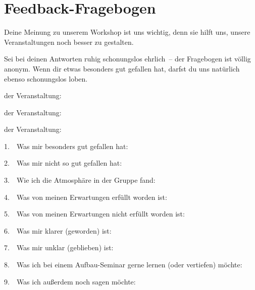 \documentclass[a4paper,12pt]{scrartcl}
\begin{document}
    \raggedbottom


    \section*{Feedback-Fragebogen}

    Deine Meinung zu unserem Workshop ist uns wichtig, denn sie hilft uns, unsere Veranstaltungen noch besser zu gestalten.

    Sei bei deinen Antworten ruhig schonungslos ehrlich~-- der Fragebogen ist völlig anonym. Wenn dir etwas besonders gut gefallen hat, darfst du uns natürlich ebenso schonungslos loben.

     der Veranstaltung:

     der Veranstaltung:

     der Veranstaltung:
    \vspace{1em}


    1.~~Was mir besonders gut gefallen hat:
    \answerspace

    2.~~Was mir nicht so gut gefallen hat:
    \answerspace

    3.~~Wie ich die Atmosphäre in der Gruppe fand:
    \answerspace

    4.~~Was von meinen Erwartungen erfüllt worden ist:
    \answerspace

    5.~~Was von meinen Erwartungen nicht erfüllt worden ist:
    \answerspace

    6.~~Was mir klarer (geworden) ist:
    \answerspace

    7.~~Was mir unklar (geblieben) ist:
    \answerspace

    8.~~Was ich bei einem Aufbau-Seminar gerne lernen (oder vertiefen) möchte:
    \answerspace

    9.~~Was ich außerdem noch sagen möchte:
\end{document}
